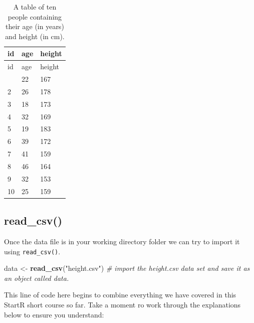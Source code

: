 \documentclass[
]{book}
\newenvironment{Shaded}{\begin{snugshade}}{\end{snugshade}}
\newcommand{\CommentTok}[1]{\textcolor[rgb]{0.56,0.35,0.01}{\textit{#1}}}
\newcommand{\FunctionTok}[1]{\textcolor[rgb]{0.13,0.29,0.53}{\textbf{#1}}}
\newcommand{\NormalTok}[1]{#1}
\newcommand{\OtherTok}[1]{\textcolor[rgb]{0.56,0.35,0.01}{#1}}
\newcommand{\StringTok}[1]{\textcolor[rgb]{0.31,0.60,0.02}{#1}}
\let\oldsubsection\subsection
\renewcommand{\subsection}{\needspace{3\baselineskip}\oldsubsection}  %
\begin{document}
\begin{longtable}[]{@{}lll@{}}
\caption{A table of ten people containing their age (in years) and height (in cm).}\tabularnewline
\toprule\noalign{}
id & age & height \\
\midrule\noalign{}
\endfirsthead
\toprule\noalign{}
id & age & height \\
\midrule\noalign{}
\endhead
\bottomrule\noalign{}
\endlastfoot
1 & 22 & 167 \\
2 & 26 & 178 \\
3 & 18 & 173 \\
4 & 32 & 169 \\
5 & 19 & 183 \\
6 & 39 & 172 \\
7 & 41 & 159 \\
8 & 46 & 164 \\
9 & 32 & 153 \\
10 & 25 & 159 \\
\end{longtable}

\subsection{read\_csv()}\label{read_csv}

Once the data file is in your working directory folder we can try to import it using \texttt{read\_csv()}.

\begin{Shaded}
\begin{Highlighting}[]
\NormalTok{data }\OtherTok{\textless{}{-}} \FunctionTok{read\_csv}\NormalTok{(}\StringTok{"height.csv"}\NormalTok{) }\CommentTok{\# import the height.csv data set and save it as an object called \textasciigrave{}data\textasciigrave{}.}
\end{Highlighting}
\end{Shaded}

This line of code here begins to combine everything we have covered in this StartR short course so far. Take a moment ro work through the explanations below to ensure you understand:
\end{document}
